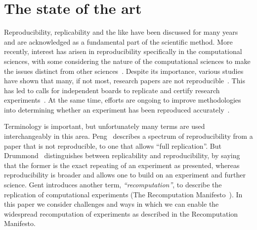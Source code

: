 \section{The state of the art}
\label{s:recomputation}

Reproducibility, replicability and the like have been discussed for
many years~\cite{lubin:replicability} and are acknowledged as a
fundamental part of the scientific method. More recently, interest has
arisen in reproducibility specifically in the computational sciences, with
some considering the nature of the computational sciences to make the
issues distinct from other sciences~\cite{donoho:reproducible}.
Despite its importance, various studies have shown that many, if not
most, research papers are not
reproducible~\cite{bonnet:repeatability,hornbaek:replications,ioannidis:repeatability}.
This has led to calls for independent boards to replicate and certify
research experiments~\cite{baker:verify}. At the same time, efforts
are ongoing to improve methodologies into determining whether an
experiment has been reproduced accurately~\cite{johnson:evidence}.

Terminology is important, but unfortunately many terms are used
interchangeably in this area.  Peng~\cite{peng:reproducible} describes
a spectrum of reproducibility from a paper that is not reproducible,
to one that allows ``full replication''. But
Drummond~\cite{drummond:replicability} distinguishes between
replicability and reproducibility, by saying that the former is the
exact repeating of an experiment as presented, whereas reproducibility
is broader and allows one to build on an experiment and further
science. Gent introduces another term, \emph{``recomputation''}, to describe
the replication of computational experiments (The Recomputation
Manifesto~\cite{gent:recomputation}).
In this paper we consider challenges and ways in which we can enable
the widespread recomputation of experiments as described in the
Recomputation Manifesto.

